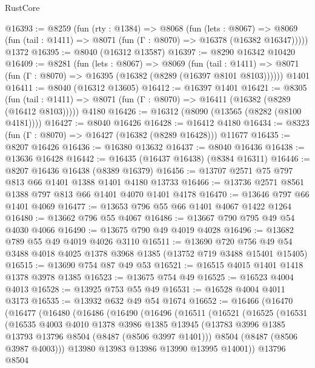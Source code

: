 \begin{lexlean}{RustCore}
\begin{coremodule}
@16393 := @8259
    (fun (rty : @1384) =>
    @8068
      (fun (lets : @8067) =>
      @8069 (fun (tail : @1411) => @8071 (fun (Γ : @8070) => @16378 (@16382 @16347)))))
    @1372
@16395 := @8040 (@16312 @13587)
@16397 := @8290 @16342 @10420
@16409 := @8281
    (fun (lets : @8067) =>
    @8069
      (fun (tail : @1411) =>
      @8071 (fun (Γ : @8070) => @16395 (@16382 (@8289 (@16397 @8101 @8103))))))
    @1401
@16411 := @8040 (@16312 @13605)
@16412 := @16397 @1401
@16421 := @8305
    (fun (tail : @1411) => @8071 (fun (Γ : @8070) => @16411 (@16382 (@8289 (@16412 @8103)))))
    @4180
@16426 := @16312 (@8090 (@13565 (@8282 (@8100 @4181))))
@16427 := @8040 @16426
@16428 := @16412 @4180
@16434 := @8323 (fun (Γ : @8070) => @16427 (@16382 (@8289 @16428))) @11677
@16435 := @8207 @16426
@16436 := @16380 @13632
@16437 := @8040 @16436
@16438 := @13636 @16428
@16442 := @16435 (@16437 @16438) (@8384 @16311)
@16446 := @8207 @16436 @16438 (@8389 @16379)
@16456 := @13707 @2571 @75 @797 @813 @66 @1401 @1388 @1401 @4180 @13733
@16466 := @13736 @2571 @8561 @1388 @797 @813 @66 @1401 @4070 @1401 @4178
@16470 := @13646 @797 @66 @1401 @4069
@16477 := @13653 @796 @55 @66 @1401 @4067 @1422 @1264
@16480 := @13662 @796 @55 @4067
@16486 := @13667 @790 @795 @49 @54 @4030 @4066
@16490 := @13675 @790 @49 @4019 @4028
@16496 := @13682 @789 @55 @49 @4019 @4026 @3110
@16511 := @13690
    @720
    @756
    @49
    @54
    @3488
    @4018
    @4025
    @1378
    @3968
    @1385
    (@13752 @719 @3488 @15401 @15405)
@16515 := @13690 @754 @87 @49 @53
@16521 := @16515 @4015 @1401 @1418 @1378 @3978 @1385
@16523 := @13675 @754 @49
@16525 := @16523 @4004 @4013
@16528 := @13925 @753 @55 @49
@16531 := @16528 @4004 @4011 @3173
@16535 := @13932 @632 @49 @54 @1674
@16652 := @16466
    (@16470
      (@16477
        (@16480
          (@16486
            (@16490
              (@16496
                (@16511
                  (@16521
                    (@16525
                      (@16531
                        (@16535
                          @4003
                          @4010
                          @1378
                          @3986
                          @1385
                          @13945
                          (@13783 @3996 @1385 @13793 @13796 @8504 (@8487 (@8506 @3997 @1401)))
                          @8504
                          (@8487 (@8506 @3987 @4003)))
                        @13980
                        @13983
                        @13986
                        @13990
                        @13995
                        @14001))
                    @13796
                    @8504

\end{coremodule}
\end{lexlean}
